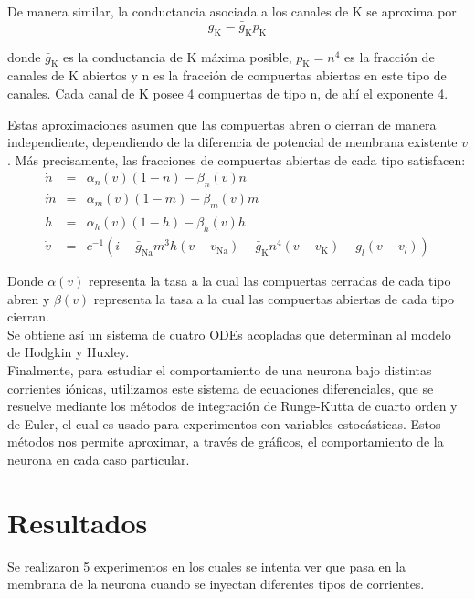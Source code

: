 \documentclass[aps,prl,twocolumn,groupedaddress]{revtex4-2}
\begin{document}
De manera similar, la conductancia asociada a los canales de K se aproxima por 
$$g_{\mathrm{K}} = \bar{g}_{\mathrm{K}}p_{\mathrm{K}}$$ 

donde $\bar{g}_{\mathrm{K}}$  es la conductancia de K máxima posible, $p_{\mathrm{K}} = n^4$ es la fracción de canales de K abiertos y n es la fracción de compuertas abiertas en este tipo de canales. Cada canal de K posee 4 compuertas de tipo n, de ahí el exponente 4.

Estas aproximaciones asumen que las compuertas abren o cierran de manera independiente, dependiendo de la diferencia de potencial de membrana existente $v$. Más precisamente, las fracciones de compuertas abiertas de cada tipo satisfacen:
\begin{eqnarray*}
\dot{n}&=&\alpha_n(v)(1-n)-\beta_n(v) n\\
\dot{m}&=&\alpha_m(v)(1-m)-\beta_m(v) m\\
\dot{h}&=&\alpha_h(v)(1-h)-\beta_h(v) h\\
\dot{v}&=&c^{-1}(i-\bar{g}_{\mathrm{Na}}m^3h(v-v_{\mathrm{Na}})-\bar{g}_{\mathrm{K}}n^4(v-v_{\mathrm{K}})-g_{l}(v-v_{l}))
\end{eqnarray*}

Donde $\alpha(v)$ representa la tasa a la cual las compuertas cerradas de cada tipo abren y $\beta(v)$ representa la tasa a la cual las compuertas abiertas de cada tipo cierran.\\

Se obtiene así un sistema de cuatro ODEs acopladas  que determinan al modelo de Hodgkin y Huxley.\\

Finalmente, para estudiar el comportamiento de una neurona bajo distintas corrientes iónicas, utilizamos este sistema de ecuaciones diferenciales, que se resuelve mediante los métodos de integración de Runge-Kutta de cuarto orden 
y de Euler, el cual es usado para experimentos con variables estocásticas.  Estos métodos nos permite aproximar, a través de gráficos, el comportamiento de la neurona en cada caso particular.



\section{Resultados}
Se realizaron 5 experimentos en los cuales se intenta ver que pasa en la membrana de la neurona cuando se inyectan diferentes tipos de corrientes.\\
\end{document}
